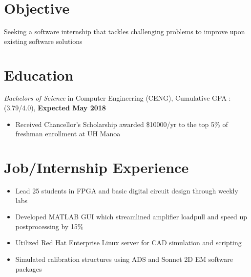 \documentclass{resume}
\begin{document}
\raggedbottom
{}


\section{Objective}
Seeking a software internship that tackles challenging problems to improve upon existing software solutions

\section{%
Education}
\textit{Bachelors of Science} in Computer Engineering (CENG), Cumulative GPA : (3.79/4.0), \textbf{Expected May 2018} 
\begin{itemize}[noitemsep,nolistsep]
  \item Received Chancellor's Scholarship awarded \$10000/yr to the top 5\% of freshman enrollment at UH Manoa
\end{itemize}
\section{%
 Job/Internship Experience}

\begin{itemize}[noitemsep,nolistsep]
  \item Lead 25 students in FPGA and basic digital circuit design through weekly labs
\end{itemize} 

\begin{itemize}[noitemsep,nolistsep]
  \item Developed MATLAB GUI which streamlined amplifier loadpull and speed up postprocessing by 15\%
  \item Utilized Red Hat Enterprise Linux server for CAD simulation and scripting
  \item Simulated calibration structures using ADS and Sonnet 2D EM software packages
\end{itemize}
\end{document}
